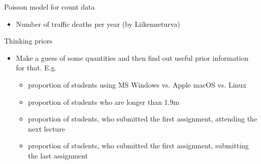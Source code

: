 \documentclass[english,t]{beamer}
\begin{document}
\begin{frame}{Poisson model for count data}

  \begin{itemize}
  \item Number of traffic deaths per year (by Liikenneturva)
  \end{itemize}

  \vspace{\baselineskip}
  
\end{frame}

\begin{frame}{Thinking priors}

  \begin{itemize}
  \item Make a guess of some quantities and then find out useful
    prior information for that. E.g.
    \begin{itemize}
    \item proportion of students using MS Windows vs. Apple macOS vs. Linux
    \item proportion of students who are longer than 1.9m
    \item proportion of students, who submitted the first assignment,
      attending the next lecture
    \item proportion of students, who submitted the first assignment,
      submitting the last assignment
    \end{itemize}
  \end{itemize}
  
\end{frame}
\end{document}
